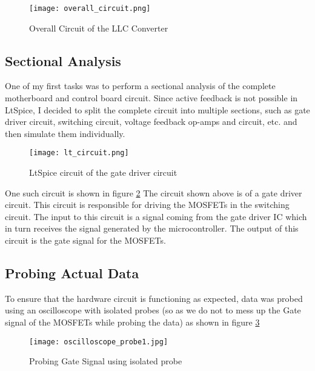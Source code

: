 \begin{figure}[H]
    \centering
    \texttt{[image: overall\_circuit.png]}
    \caption{Overall Circuit of the LLC Converter}
    \label{fig:Simulation1}
\end{figure}

\subsection{Sectional Analysis}
One of my first tasks was to perform a sectional analysis of the complete motherboard and control board circuit.
\noindent
Since active feedback is not possible in LtSpice, I decided to split the complete circuit into multiple sections, such as gate driver circuit, switching circuit, voltage feedback op-amps and circuit, etc. and then simulate them individually.\\
\begin{figure}[H]
    \centering
    \texttt{[image: lt\_circuit.png]}
    \caption{LtSpice circuit of the gate driver circuit}
    \label{fig:lt_circuit}
\end{figure}

\noindent
One such circuit is shown in figure \ref{fig:lt_circuit}
\noindent
The circuit shown above is of a gate driver circuit. This circuit is responsible for driving the MOSFETs in the switching circuit. The input to this circuit is a signal coming from the gate driver IC which in turn receives the signal generated by the microcontroller. The output of this circuit is the gate signal for the MOSFETs.\\

\subsection{Probing Actual Data}
To ensure that the hardware circuit is functioning as expected, data was probed using an oscilloscope with isolated probes (so as we do not to mess up the Gate signal of the MOSFETs while probing the data) as shown in figure \ref{fig:oscilloscope_probe}
\begin{figure}[H]
    \centering
    \texttt{[image: oscilloscope\_probe1.jpg]}
    \caption{Probing Gate Signal using isolated probe}
    \label{fig:oscilloscope_probe}
\end{figure}


